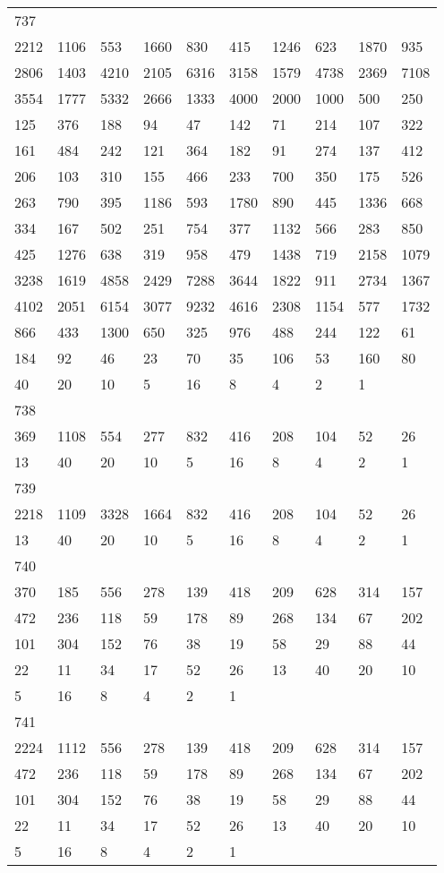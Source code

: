 \begin{longtable}{*{10}{l}}
737&&&&&&&&&\\
2212& 1106& 553& 1660& 830& 415& 1246& 623& 1870& 935\\
2806& 1403& 4210& 2105& 6316& 3158& 1579& 4738& 2369& 7108\\
3554& 1777& 5332& 2666& 1333& 4000& 2000& 1000& 500& 250\\
125& 376& 188& 94& 47& 142& 71& 214& 107& 322\\
161& 484& 242& 121& 364& 182& 91& 274& 137& 412\\
206& 103& 310& 155& 466& 233& 700& 350& 175& 526\\
263& 790& 395& 1186& 593& 1780& 890& 445& 1336& 668\\
334& 167& 502& 251& 754& 377& 1132& 566& 283& 850\\
425& 1276& 638& 319& 958& 479& 1438& 719& 2158& 1079\\
3238& 1619& 4858& 2429& 7288& 3644& 1822& 911& 2734& 1367\\
4102& 2051& 6154& 3077& 9232& 4616& 2308& 1154& 577& 1732\\
866& 433& 1300& 650& 325& 976& 488& 244& 122& 61\\
184& 92& 46& 23& 70& 35& 106& 53& 160& 80\\
40& 20& 10& 5& 16& 8& 4& 2& 1& \\

738&&&&&&&&&\\
369& 1108& 554& 277& 832& 416& 208& 104& 52& 26\\
13& 40& 20& 10& 5& 16& 8& 4& 2& 1\\

739&&&&&&&&&\\
2218& 1109& 3328& 1664& 832& 416& 208& 104& 52& 26\\
13& 40& 20& 10& 5& 16& 8& 4& 2& 1\\

740&&&&&&&&&\\
370& 185& 556& 278& 139& 418& 209& 628& 314& 157\\
472& 236& 118& 59& 178& 89& 268& 134& 67& 202\\
101& 304& 152& 76& 38& 19& 58& 29& 88& 44\\
22& 11& 34& 17& 52& 26& 13& 40& 20& 10\\
5& 16& 8& 4& 2& 1& \\

741&&&&&&&&&\\
2224& 1112& 556& 278& 139& 418& 209& 628& 314& 157\\
472& 236& 118& 59& 178& 89& 268& 134& 67& 202\\
101& 304& 152& 76& 38& 19& 58& 29& 88& 44\\
22& 11& 34& 17& 52& 26& 13& 40& 20& 10\\
5& 16& 8& 4& 2& 1& \\


\end{longtable}
